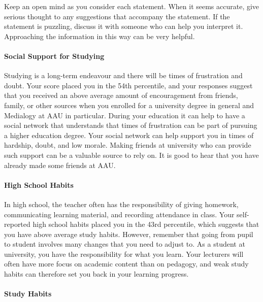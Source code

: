 \documentclass[]{article}
\let\oldparagraph\paragraph
\renewcommand{\paragraph}[1]{\oldparagraph{#1}\mbox{}}
\begin{document}
Keep an open mind as you consider each statement. When it seems
accurate, give serious thought to any suggestions that accompany the
statement. If the statement is puzzling, discuss it with someone who can
help you interpret it. Approaching the information in this way can be
very helpful.

\paragraph{Social Support for
Studying}\label{social-support-for-studying}

Studying is a long-term endeavour and there will be times of frustration
and doubt. Your score placed you in the 54th percentile, and your
responses suggest that you received an above average amount of
encouragement from friends, family, or other sources when you enrolled
for a university degree in general and Medialogy at AAU in particular.
During your education it can help to have a social network that
understands that times of frustration can be part of pursuing a higher
education degree. Your social network can help support you in times of
hardship, doubt, and low morale. Making friends at university who can
provide such support can be a valuable source to rely on. It is good to
hear that you have already made some friends at AAU.

\paragraph{High School Habits}\label{high-school-habits}

In high school, the teacher often has the responsibility of giving
homework, communicating learning material, and recording attendance in
class. Your self-reported high school habits placed you in the 43rd
percentile, which suggests that you have above average study habits.
However, remember that going from pupil to student involves many changes
that you need to adjust to. As a student at university, you have the
responsibility for what you learn. Your lecturers will often have more
focus on academic content than on pedagogy, and weak study habits can
therefore set you back in your learning progress.

\paragraph{Study Habits}\label{study-habits}
\end{document}

